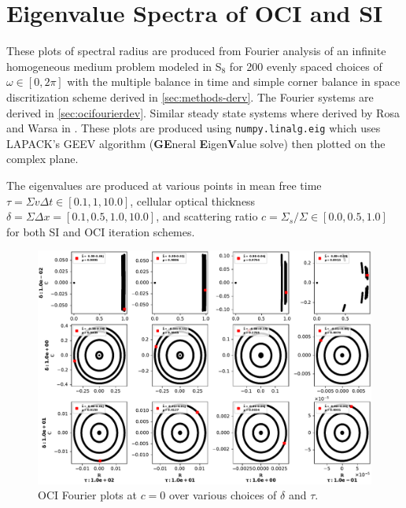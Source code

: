 

\chapter{Eigenvalue Spectra of OCI and SI}
\label{chap:spec_rads}

These plots of spectral radius are produced from Fourier analysis of an infinite homogeneous medium problem modeled in S$_8$ for \num{200} evenly spaced choices of $\omega \in [0,2\pi]$ with the multiple balance in time and simple corner balance in space discritization scheme derived in \ref{sec:methods-derv}.
The Fourier systems are derived in \ref{sec:ocifourierdev}.
Similar steady state systems where derived by Rosa and Warsa in \cite{rosa_cellwise_2013, tsa_2d2007rosa}.
These plots are produced using \texttt{numpy.linalg.eig} \cite{van_der_walt_numpy_2011} which uses LAPACK's GEEV algorithm (\textbf{GE}neral \textbf{E}igen\textbf{V}alue solve) \cite{laug} then plotted on the complex plane.

The eigenvalues are produced at various points in mean free time $\tau=\Sigma v\Delta t \in [0.1, 1, 10.0]$, cellular optical thickness $\delta=\Sigma\Delta x=[0.1, 0.5, 1.0, 10.0]$, and scattering ratio $c = \Sigma_s/\Sigma \in [0.0, 0.5, 1.0]$ for both SI and OCI iteration schemes.


\begin{figure}
\begin{center}
	\includegraphics[width=\textwidth]{appendix/eig_plots/oci0.0.pdf}
	\caption{OCI Fourier plots at $c=0$ over various choices of $\delta$ and $\tau$.}
\end{center}
\end{figure}

